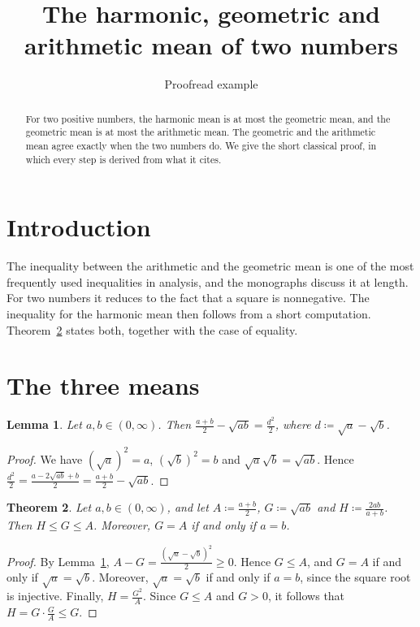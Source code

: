 \documentclass{article}
\title{The harmonic, geometric and arithmetic mean of two numbers}
\author{Proofread example}
\date{}
\newtheorem{theorem}{Theorem}
\newtheorem{lemma}[theorem]{Lemma}
\theoremstyle{remark}
\begin{document}
\maketitle

\begin{abstract}
For two positive numbers, the harmonic mean is at most the geometric mean, and the geometric mean is at most the arithmetic mean.
The geometric and the arithmetic mean agree exactly when the two numbers do.
We give the short classical proof, in which every step is derived from what it cites.
\end{abstract}

\section{Introduction}

The inequality between the arithmetic and the geometric mean is one of the most frequently used inequalities in analysis, and the monographs \cite{hardy1952inequalities,steele2004cauchy} discuss it at length.
For two numbers it reduces to the fact that a square is nonnegative.
The inequality for the harmonic mean then follows from a short computation.
Theorem~\ref{thm:means} states both, together with the case of equality.

\section{The three means}

\begin{lemma}\label{lem:square}
Let $a,b\in(0,\infty)$.
Then $\frac{a+b}{2}-\sqrt{ab}=\frac{d^2}{2}$, where $d\coloneqq\sqrt a-\sqrt b$.
\end{lemma}

\begin{proof}
We have $(\sqrt a)^2=a$, $(\sqrt b)^2=b$ and $\sqrt a\sqrt b=\sqrt{ab}$.
Hence $\frac{d^2}{2}=\frac{a-2\sqrt{ab}+b}{2}=\frac{a+b}{2}-\sqrt{ab}$.
\end{proof}

\begin{theorem}\label{thm:means}
Let $a,b\in(0,\infty)$, and let $A\coloneqq\frac{a+b}{2}$, $G\coloneqq\sqrt{ab}$ and $H\coloneqq\frac{2ab}{a+b}$.
Then $H\le G\le A$.
Moreover, $G=A$ if and only if $a=b$.
\end{theorem}

\begin{proof}
By Lemma~\ref{lem:square}, $A-G=\frac{(\sqrt a-\sqrt b)^2}{2}\ge0$.
Hence $G\le A$, and $G=A$ if and only if $\sqrt a=\sqrt b$.
Moreover, $\sqrt a=\sqrt b$ if and only if $a=b$, since the square root is injective.
Finally, $H=\frac{G^2}{A}$.
Since $G\le A$ and $G>0$, it follows that $H=G\cdot\frac{G}{A}\le G$.
\end{proof}
\end{document}
